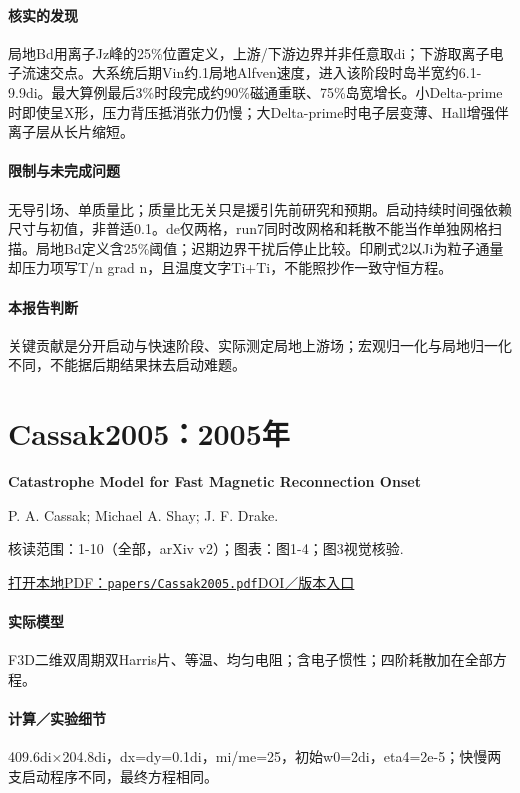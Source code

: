 \paragraph{核实的发现}局地Bd用离子Jz峰的25\%位置定义，上游/下游边界并非任意取di；下游取离子电子流速交点。大系统后期Vin约.1局地Alfven速度，进入该阶段时岛半宽约6.1-9.9di。最大算例最后3\%时段完成约90\%磁通重联、75\%岛宽增长。小Delta-prime时即使呈X形，压力背压抵消张力仍慢；大Delta-prime时电子层变薄、Hall增强伴离子层从长片缩短。

\paragraph{限制与未完成问题}无导引场、单质量比；质量比无关只是援引先前研究和预期。启动持续时间强依赖尺寸与初值，非普适0.1。de仅两格，run7同时改网格和耗散不能当作单独网格扫描。局地Bd定义含25\%阈值；迟期边界干扰后停止比较。印刷式2以Ji为粒子通量却压力项写T/n grad n，且温度文字Ti+Ti，不能照抄作一致守恒方程。

\paragraph{本报告判断}关键贡献是分开启动与快速阶段、实际测定局地上游场；宏观归一化与局地归一化不同，不能据后期结果抹去启动难题。

\section{Cassak2005：2005年}\label{paper:Cassak2005}

\textbf{Catastrophe Model for Fast Magnetic Reconnection Onset}\citep{Cassak2005}\

P. A. Cassak;  Michael A. Shay;  J. F. Drake.

\textsf{核读范围：}1-10（全部，arXiv v2）；\textsf{图表：}图1-4；图3视觉核验.

\href{run:papers/Cassak2005.pdf}{打开本地PDF：\texttt{papers/Cassak2005.pdf}}\quad\href{https://doi.org/10.1103/physrevlett.95.235002}{DOI／版本入口}

\paragraph{实际模型}F3D二维双周期双Harris片、等温、均匀电阻；含电子惯性；四阶耗散加在全部方程。

\paragraph{计算／实验细节}409.6di×204.8di，dx=dy=0.1di，mi/me=25，初始w0=2di，eta4=2e-5；快慢两支启动程序不同，最终方程相同。

